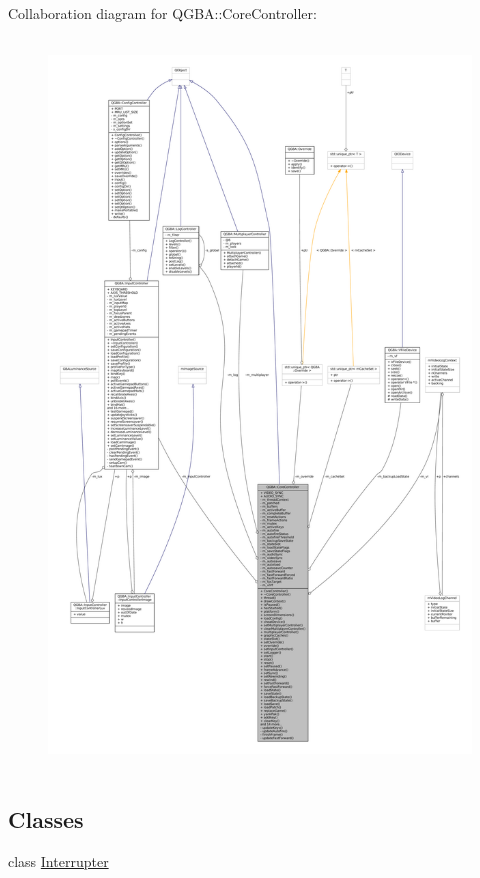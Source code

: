 Collaboration diagram for Q\+G\+BA\+:\+:Core\+Controller\+:
\nopagebreak
\begin{figure}[H]
\begin{center}
\leavevmode
\includegraphics[height=550pt]{class_q_g_b_a_1_1_core_controller__coll__graph}
\end{center}
\end{figure}
\subsection*{Classes}
\begin{DoxyCompactItemize}
\item 
class \mbox{\hyperlink{class_q_g_b_a_1_1_core_controller_1_1_interrupter}{Interrupter}}
\end{DoxyCompactItemize}
